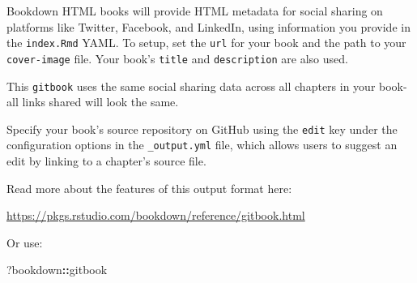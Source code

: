 \documentclass[
]{book}
\newenvironment{Shaded}{\begin{snugshade}}{\end{snugshade}}
\newcommand{\NormalTok}[1]{#1}
\newcommand{\SpecialCharTok}[1]{\textcolor[rgb]{0.81,0.36,0.00}{\textbf{#1}}}
\begin{document}
Bookdown HTML books will provide HTML metadata for social sharing on platforms like Twitter, Facebook, and LinkedIn, using information you provide in the \texttt{index.Rmd} YAML. To setup, set the \texttt{url} for your book and the path to your \texttt{cover-image} file. Your book's \texttt{title} and \texttt{description} are also used.

This \texttt{gitbook} uses the same social sharing data across all chapters in your book- all links shared will look the same.

Specify your book's source repository on GitHub using the \texttt{edit} key under the configuration options in the \texttt{\_output.yml} file, which allows users to suggest an edit by linking to a chapter's source file.

Read more about the features of this output format here:

\url{https://pkgs.rstudio.com/bookdown/reference/gitbook.html}

Or use:

\begin{Shaded}
\begin{Highlighting}[]
\NormalTok{?bookdown}\SpecialCharTok{::}\NormalTok{gitbook}
\end{Highlighting}
\end{Shaded}


  
\end{document}
